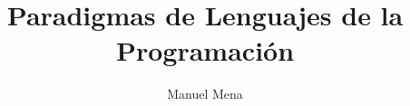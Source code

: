 \documentclass[a4paper]{article}
\theoremstyle{remark}
\theoremstyle{definition}
\theoremstyle{plain}
\begin{document}
\title{Paradigmas de Lenguajes de la Programación}
\author{Manuel Mena}
\maketitle

\tableofcontents

\newpage

\end{document}
